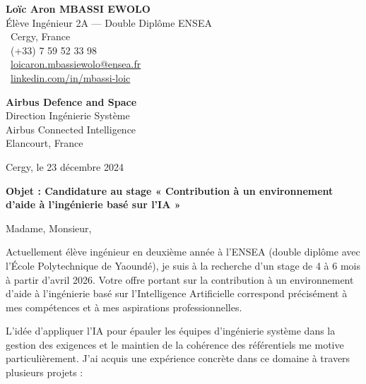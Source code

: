 \documentclass[a4paper,11pt]{article}
\begin{document}
\pagestyle{empty}

\noindent
\begin{minipage}[t]{0.55\textwidth}
\textbf{Loïc Aron MBASSI EWOLO} \\
Élève Ingénieur 2A — Double Diplôme ENSEA \\
\faMapMarker\ Cergy, France \\
\faPhone\ (+33) 7 59 52 33 98 \\
\faEnvelope\ \href{mailto:loicaron.mbassiewolo@ensea.fr}{loicaron.mbassiewolo@ensea.fr} \\
\faLinkedin\ \href{https://www.linkedin.com/in/mbassi-loic-3942a9246/}{linkedin.com/in/mbassi-loic}
\end{minipage}
\hfill
\begin{minipage}[t]{0.40\textwidth}
\raggedleft
\textbf{Airbus Defence and Space} \\
Direction Ingénierie Système \\
Airbus Connected Intelligence \\
Elancourt, France
\end{minipage}

\vspace{1cm}

\noindent Cergy, le 23 décembre 2024

\vspace{0.8cm}

\noindent \textbf{Objet : Candidature au stage « Contribution à un environnement d'aide à l'ingénierie basé sur l'IA »}

\vspace{0.6cm}

\noindent Madame, Monsieur,

\vspace{0.4cm}

Actuellement élève ingénieur en deuxième année à l'ENSEA (double diplôme avec l'École Polytechnique de Yaoundé), je suis à la recherche d'un stage de 4 à 6 mois à partir d'avril 2026. Votre offre portant sur la contribution à un environnement d'aide à l'ingénierie basé sur l'Intelligence Artificielle correspond précisément à mes compétences et à mes aspirations professionnelles.

\vspace{0.3cm}

L'idée d'appliquer l'IA pour épauler les équipes d'ingénierie système dans la gestion des exigences et le maintien de la cohérence des référentiels me motive particulièrement. J'ai acquis une expérience concrète dans ce domaine à travers plusieurs projets :
\end{document}
